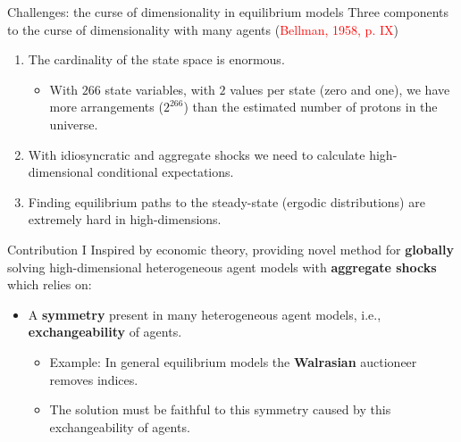 \documentclass[aspectratio=169,10pt]{beamer}
\newcommand{\emphcolor}[1]{\textbf{\textcolor{emphcolorval}{#1}}}
\begin{document}

\begin{frame}{Challenges: the curse of dimensionality in equilibrium models}
	 Three components to the curse of dimensionality with many agents (\textcolor{red}{Bellman, 1958, p. IX})\vspace{0.1in}

		      \begin{enumerate}
			      \item The cardinality of the state space is enormous.\medskip
			       \begin{itemize}

			        \item With $266$ state variables, with $2$ values per state (zero and one), we have more arrangements ($2^{266}$) than the estimated number of protons in the universe.\vspace{0.1in} 
		        \end{itemize}

			      \item With idiosyncratic and aggregate shocks we need to calculate high-dimensional conditional expectations.\vspace{0.1in}
			      
			      \item Finding equilibrium paths to the steady-state (ergodic distributions) are extremely hard in high-dimensions.
		      \end{enumerate}
\end{frame}

\begin{frame}{Contribution I}
	Inspired by economic theory, providing novel method for \emphcolor{globally} solving high-dimensional heterogeneous agent models with \emphcolor{aggregate shocks} which relies on:\vspace{0.1in}
	\begin{itemize}
		\item A \emphcolor{symmetry} present in many heterogeneous agent models, i.e., \emphcolor{exchangeability} of agents.\vspace{0.1in}
		\begin{itemize}
			\item Example: In general equilibrium models the \emphcolor{Walrasian} auctioneer removes indices.\vspace{0.1in}
			\item The solution must be faithful to this symmetry caused by this exchangeability of agents.
		\end{itemize}
	\end{itemize}
		
\end{frame}
\end{document}
